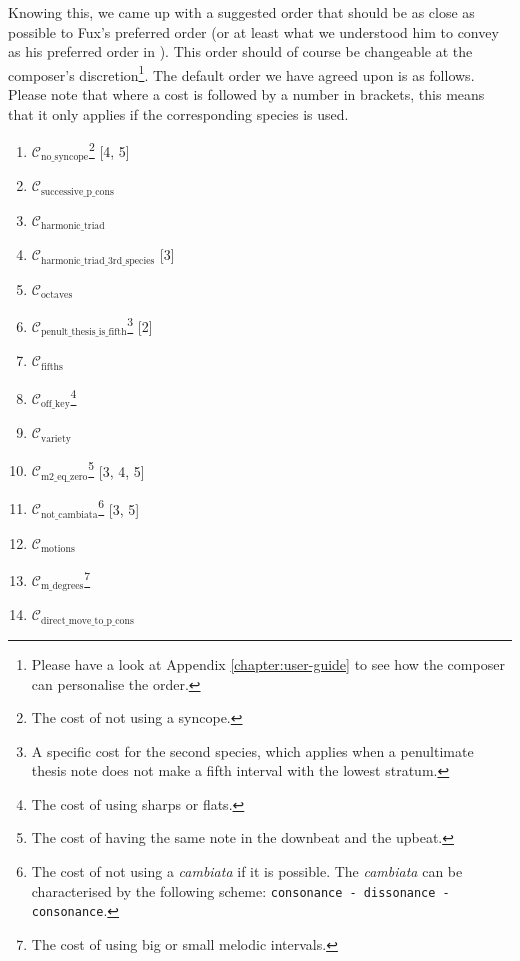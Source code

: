 Knowing this, we came up with a suggested order that should be as close as possible to Fux's preferred order (or at least what we understood him to convey as his preferred order in \gap). This order should of course be changeable at the composer's discretion\footnote{Please have a look at Appendix \ref{chapter:user-guide} to see how the composer can personalise the order.}. The default order we have agreed upon is as follows. Please note that where a cost is followed by a number in brackets, this means that it only applies if the corresponding species is used.
\begin{multicols}{2}
    \begin{enumerate}\label{fig:default-order-lexico}
        \item $\mathcal{C}_\text{no\_syncope}$\footnote{The cost of not using a syncope.} [4, 5] 
        \item $\mathcal{C}_\text{successive\_p\_cons}$
        \item $\mathcal{C}_\text{harmonic\_triad}$
        \item $\mathcal{C}_\text{harmonic\_triad\_3rd\_species}$ [3]
        \item $\mathcal{C}_\text{octaves}$
        \item $\mathcal{C}_\text{penult\_thesis\_is\_fifth}$\footnote{A specific cost for the second species, which applies when a penultimate thesis note does not make a fifth interval with the lowest stratum.} [2]
        \item $\mathcal{C}_\text{fifths}$
        \item $\mathcal{C}_\text{off\_key}$\footnote{The cost of using sharps or flats.}
        \item $\mathcal{C}_\text{variety}$
        \item $\mathcal{C}_\text{m2\_eq\_zero}$\footnote{The cost of having the same note in the downbeat and the upbeat.} [3, 4, 5]
        \item $\mathcal{C}_\text{not\_cambiata}$\footnote{The cost of not using a \textit{cambiata} if it is possible. The \textit{cambiata} can be characterised by the following scheme: \texttt{consonance - dissonance - consonance}.} [3, 5]
        \item $\mathcal{C}_\text{motions}$
        \item $\mathcal{C}_\text{m\_degrees}$\footnote{The cost of using big or small melodic intervals.}        
        \item $\mathcal{C}_\text{direct\_move\_to\_p\_cons}$
    \end{enumerate}
\end{multicols}

